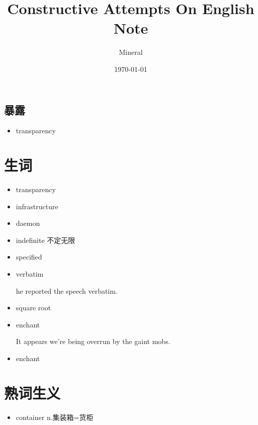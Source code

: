 \documentclass[utf8]{ctexart}
\author{Mineral}
\title{Constructive Attempts On English Note }
\date {\today}
\begin{document}
		\maketitle
		\subsection{暴露}
		\begin{itemize}
				\item transparency 
		\end{itemize}
		\section{生词}
		\begin{itemize}
				\item transparency
				\item infrastructure	
				\item daemon	
				\item indefinite  不定无限	
				\item specified	
				\item verbatim 
				\par he reported the speech verbatim.
				\item square root
				\item enchant	
				\par It appears we're being overrun by the gaint mobs.
				\item enchant	



							
		\end{itemize}
		\section{熟词生义}
		\begin{itemize}
				\item container n.集装箱=货柜
		\end{itemize}
		
\end{document}
